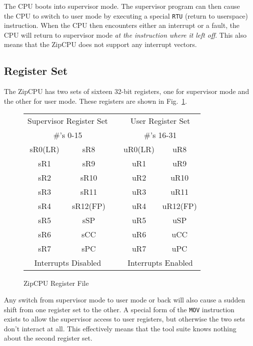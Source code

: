 \documentclass{gqtekspec}
\begin{document}
The CPU boots into supervisor mode.  The supervisor program can then cause
the CPU to switch to user mode by executing a special {\tt RTU} (return to
userspace) instruction.  When the CPU then encounters either an interrupt or
a fault, the CPU will return to supervisor mode {\em at the instruction where
it left off}.  This also means that the ZipCPU does not support any
interrupt vectors.
\subsection{Register Set}
The ZipCPU has two sets of sixteen 32-bit registers, one for supervisor mode
and the other for user mode.  These registers are shown in
Fig.~\ref{fig:regset}.
\begin{figure}\begin{center}
\begin{tabular}{|c|c|c|c|c|}
\multicolumn{2}{c}{Supervisor Register Set} &
	\multicolumn{1}{c}{} &
	\multicolumn{2}{c}{User Register Set} \\
\multicolumn{2}{c}{\#'s 0-15} & \multicolumn{1}{c}{} &
	\multicolumn{2}{c}{\#'s 16-31} \\\hline\hline
sR0(LR)	& sR8	&& uR0(LR) &	uR8	\\\cline{1-2}\cline{4-5}
sR1	& sR9	&& uR1	&	uR9	\\\cline{1-2}\cline{4-5}
sR2	& sR10	&& uR2	&	uR10	\\\cline{1-2}\cline{4-5}
sR3	& sR11	&& uR3	&	uR11	\\\cline{1-2}\cline{4-5}
sR4	& sR12(FP)&& uR4&	uR12(FP)\\\cline{1-2}\cline{4-5}
sR5	& sSP	&& uR5	&	uSP	\\\cline{1-2}\cline{4-5}
sR6	& sCC	&& uR6	&	uCC	\\\cline{1-2}\cline{4-5}
sR7	& sPC	&& uR7	&	uPC	\\\hline\hline
\multicolumn{2}{c}{Interrupts Disabled} &
	\multicolumn{1}{c}{} &
	\multicolumn{2}{c}{Interrupts Enabled} \\
\end{tabular}
\caption{ZipCPU Register File}\label{fig:regset}
\end{center}\end{figure}
Any switch from supervisor mode to user mode or back will also cause a sudden
shift from one register set to the other.  A special form of the {\tt MOV}
instruction exists to allow the supervisor access to user registers, but
otherwise the two sets don't interact at all.  This effectively means that the
tool suite knows nothing about the second register set.
\end{document}
